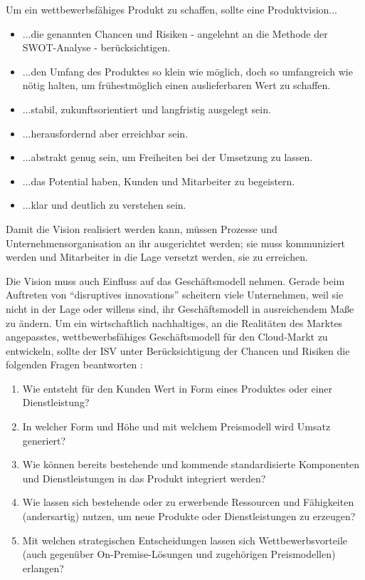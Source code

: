 Um ein wettbewerbsfähiges Produkt zu schaffen, sollte eine Produktvision...
\begin{itemize}
	\item ...die genannten Chancen und Risiken - angelehnt an die 
Methode der 
SWOT-Analyse  - berücksichtigen. 
	\item ...den Umfang des Produktes so klein wie möglich, doch so 
umfangreich wie nötig halten, um frühestmöglich einen auslieferbaren Wert zu 
schaffen.
	\item ...stabil, zukunftsorientiert und langfristig ausgelegt sein.
	\item ...herausfordernd aber erreichbar sein.
	\item ...abstrakt genug sein, um Freiheiten bei der Umsetzung zu 
lassen.
	\item ...das Potential haben, Kunden und Mitarbeiter zu begeistern.
	\item ...klar und deutlich zu verstehen sein.
\end{itemize}
Damit die Vision realisiert werden kann, müssen Prozesse und 
Unternehmensorganisation an ihr ausgerichtet werden; sie muss kommuniziert 
werden und Mitarbeiter in die Lage versetzt werden, sie zu erreichen. 

Die Vision muss auch Einfluss auf das Geschäftsmodell nehmen. Gerade beim 
Auftreten von "`disruptives innovations"' scheitern viele Unternehmen, 
weil sie nicht in der Lage oder willens sind, ihr Geschäftsmodell in 
ausreichendem Maße zu ändern. 
 Um ein 
wirtschaftlich nachhaltiges, an die Realitäten des Marktes angepasstes, 
wettbewerbsfähiges Geschäftsmodell für den Cloud-Markt zu entwickeln, sollte 
der ISV unter Berücksichtigung der Chancen und Risiken die folgenden Fragen 
beantworten :
\begin{enumerate}
	\item Wie entsteht für den Kunden Wert in Form eines Produktes oder 
		einer Dienstleistung?
	\item In welcher Form und Höhe und mit welchem Preismodell wird Umsatz 
generiert? 
	\item Wie können bereits bestehende und kommende standardisierte 
Komponenten und Dienstleistungen in das Produkt integriert werden?
	\item Wie lassen sich bestehende oder zu erwerbende Ressourcen und 
Fähigkeiten (andersartig) nutzen, um neue Produkte oder Dienstleistungen zu 
erzeugen?
	\item Mit welchen strategischen Entscheidungen lassen sich 
Wettbewerbsvorteile (auch gegenüber On-Premise-Lösungen und 
zugehörigen Preismodellen) erlangen?
\end{enumerate}


